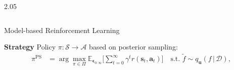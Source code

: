 \documentclass[final,12pt]{beamer}
\newlength{\colwidth}
\newcommand{\mbf}[1]{\mathbf{#1}}
\renewcommand{\mid}{\,|\,}
\newcommand{\va}{\mbf{a}}
\newcommand{\action}{\ensuremath{\mathbf{a}}}
\newcommand{\state}{\ensuremath{\mathbf{s}}}
\newcommand{\noise}{\ensuremath{\bm\epsilon}}
\newcommand{\discount}{\ensuremath{\gamma}}
\newcommand{\dataset}{\ensuremath{\mathcal{D}}}
\newcommand{\stateDomain}{\ensuremath{\mathcal{S}}}
\newcommand{\actionDomain}{\ensuremath{\mathcal{A}}}
\newcommand{\rewardFn}{\ensuremath{r}}
\newcommand{\transitionFn}{\ensuremath{f}}
\newcommand{\policy}{\ensuremath{\pi}}
\begin{document}
\begin{frame}[t]
\begin{columns}[t]
\begin{column}{2.05\colwidth}
\begin{columns}[t]
\begin{column}{\colwidth}

    \begin{block}{Model-based Reinforcement Learning}


        \alert{\bf Strategy} Policy \(\pi : \stateDomain \rightarrow \actionDomain\) based on posterior sampling:
        \begin{align} \label{eq-posterior-sampling}
        \policy^{\text{PS}} &= \arg \max_{\pi \in \Pi} \mathbb{E}_{\noise_{0:\infty}} \bigg[ \sum_{t=0}^{\infty} \discount^{t} \rewardFn(\state_{t},\va_{t}) \bigg]
        \quad \text{s.t. } \tilde{\transitionFn} \sim q_{\mathbf{u}}({\transitionFn} \mid \dataset),
        \end{align}

        \newcommand{\lab}[1]{\protect\tikz[baseline=-.5ex]{\protect\node[minimum width=1.5em,minimum height=.8em,fill=#1,opacity=.1](a){};\protect\draw[#1,semithick](a.west)--(a.east);}}



\end{block}
\end{column}
\end{columns}
\end{column}
\end{columns}
\end{frame}
\end{document}
